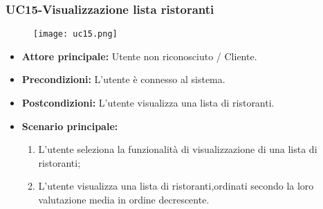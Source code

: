 \pagebreak
\subsubsection{UC15-Visualizzazione lista ristoranti}
\begin{figure}[h] \texttt{[image: uc15.png]} \end{figure}
\begin{itemize}
\item \textbf{Attore principale:} Utente non riconosciuto / Cliente.
\item \textbf{Precondizioni:} L'utente è connesso al sistema.
\item \textbf{Postcondizioni:} L'utente visualizza una lista di ristoranti.
\item \textbf{Scenario principale:}
\begin{enumerate}
    \item L'utente seleziona la funzionalità di visualizzazione di una lista di ristoranti;
    \item L'utente visualizza una lista di ristoranti,ordinati secondo la loro valutazione media in ordine decrescente.
\end{enumerate}
\end{itemize}

